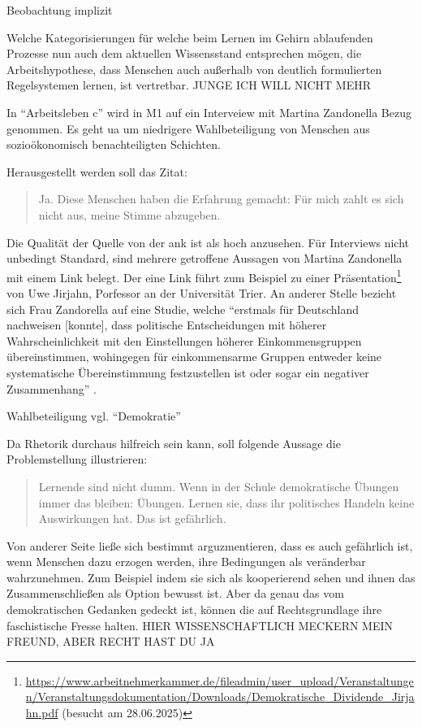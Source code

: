 Beobachtung \autocite[72-81]{Kiesel2012}
implizit 

Welche Kategorisierungen für welche beim Lernen im Gehirn ablaufenden Prozesse nun auch dem aktuellen Wissensstand entsprechen mögen, die Arbeitshypothese, dass Menschen auch außerhalb von deutlich formulierten Regelsystemen lernen, ist vertretbar. 
JUNGE ICH WILL NICHT MEHR



In \enquote{Arbeitsleben c} wird in M1 auf ein Interveiew mit Martina Zandonella \autocite{Zandonella.2024} Bezug genommen. Es geht \gls{ua} um niedrigere Wahlbeteiligung von Menschen aus sozioökonomisch benachteiligten Schichten.

Herausgestellt werden soll das Zitat:
\begin{quote}
    Ja. Diese Menschen haben die Erfahrung gemacht: Für mich zahlt es sich nicht aus, meine Stimme abzugeben.   
\end{quote}

Die Qualität der Quelle von der \gls{ank} ist als hoch anzusehen. Für Interviews nicht unbedingt Standard, sind mehrere getroffene Aussagen von Martina Zandonella mit einem Link belegt. Der eine Link führt zum Beispiel zu einer Präsentation\footnote{
    \url{https://www.arbeitnehmerkammer.de/fileadmin/user_upload/Veranstaltungen/Veranstaltungsdokumentation/Downloads/Demokratische_Dividende_Jirjahn.pdf} (besucht am 28.06.2025)
} von Uwe Jirjahn, Porfessor an der Universität Trier. An anderer Stelle bezieht sich Frau Zandorella auf eine Studie, welche 
\enquote{erstmals für Deutschland nachweisen [konnte], dass politische Entscheidungen mit höherer Wahrscheinlichkeit mit den Einstellungen höherer Einkommensgruppen übereinstimmen, wohingegen für einkommensarme Gruppen entweder keine systematische Übereinstimmung festzustellen ist oder sogar ein negativer Zusammenhang} \autocite[177]{Elsasser.2017}.


Wahlbeteiligung vgl. \enquote{Demokratie}

Da Rhetorik durchaus hilfreich sein kann, soll folgende Aussage die Problemstellung illustrieren:
\begin{quote}
    Lernende sind nicht dumm. Wenn in der Schule demokratische Übungen immer das bleiben: Übungen. Lernen sie, dass ihr politisches Handeln keine Auswirkungen hat. Das ist gefährlich.
\end{quote}

Von anderer Seite ließe sich bestimmt arguzmentieren, dass es auch gefährlich ist, wenn Menschen dazu erzogen werden, ihre Bedingungen als veränderbar wahrzunehmen. Zum Beispiel indem sie sich als kooperierend sehen und ihnen das Zusammenschließen als Option bewusst ist.
Aber da genau das vom demokratischen Gedanken gedeckt ist, können die auf Rechtsgrundlage ihre faschistische Fresse halten. HIER WISSENSCHAFTLICH MECKERN MEIN FREUND, ABER RECHT HAST DU JA



